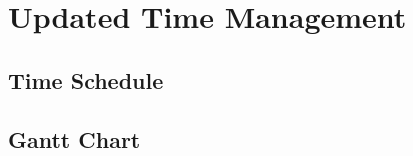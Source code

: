 
\chapter{Updated Time Management} %
\label{Chapter5}

\section{Time Schedule}


\section{Gantt Chart}

